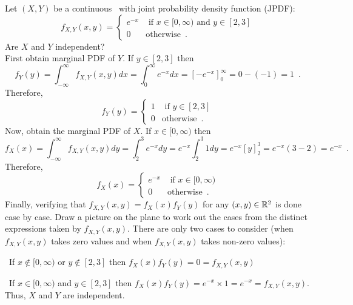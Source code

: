 \begin{ExerciseList}
\Exercise
Let $(X,Y)$ be a continuous \rv~with joint probability density function (JPDF):
\[
f_{X,Y}(x,y) = 
\begin{cases}
e^{-x} & \text{ if } x \in [0,\infty) \text{ and }  y \in [2,3]\\
0 & \text{otherwise} \enspace .
\end{cases}
\]
Are $X$ and $Y$ independent?
\Answer
~\\
First obtain marginal PDF of $Y$.  If $y \in [2,3]$ then
\[
f_Y(y) = \int_{-\infty}^{\infty} f_{X,Y}(x,y) dx = \int_0^{\infty} e^{-x} dx = \left[ -e^{-x} \right]_0^{\infty} = 0 - (-1)=1 \enspace .
\]
Therefore,
\[
f_Y(y) =
\begin{cases}
1 & \text{ if } y \in [2,3]\\
0 & \text{otherwise} \enspace .
\end{cases}
\]
Now, obtain the marginal PDF of $X$.  If $x \in [0,\infty)$ then
\[
f_X(x) = \int_{-\infty}^{\infty} f_{X,Y}(x,y) dy = \int_2^3 e^{-x} dy  = e^{-x} \int_2^3 1 dy = e^{-x} \left[ y \right]_2^3 = e^{-x} (3-2) = e^{-x} \enspace .
\]
Therefore,
\[
f_X(x) =
\begin{cases}
e^{-x} & \text{ if } x \in [0,\infty)\\
0 & \text{otherwise} \enspace .
\end{cases}
\]
Finally, verifying that $f_{X,Y}(x,y) = f_X(x) f_Y(y)$ for any $(x,y) \in \mathbb{R}^2$ is done case by case.  
Draw a picture on the plane to work out the cases from the distinct expressions taken by $f_{X,Y}(x,y)$.  
There are only two cases to consider (when $f_{X,Y}(x,y)$ takes zero values and when $f_{X,Y}(x,y)$ takes non-zero values):
\be
\item~If $x \notin [0,\infty)$ or $y \notin [2,3]$ then $f_X(x)f_Y(y)=0=f_{X,Y}(x,y)$
\item~If $x \in [0,\infty)$ and $y \in [2,3]$ then $f_X(x)f_Y(y)=e^{-x} \times 1=e^{-x}=f_{X,Y}(x,y)$.
\ee
Thus, $X$ and $Y$ are independent.


\end{ExerciseList}
